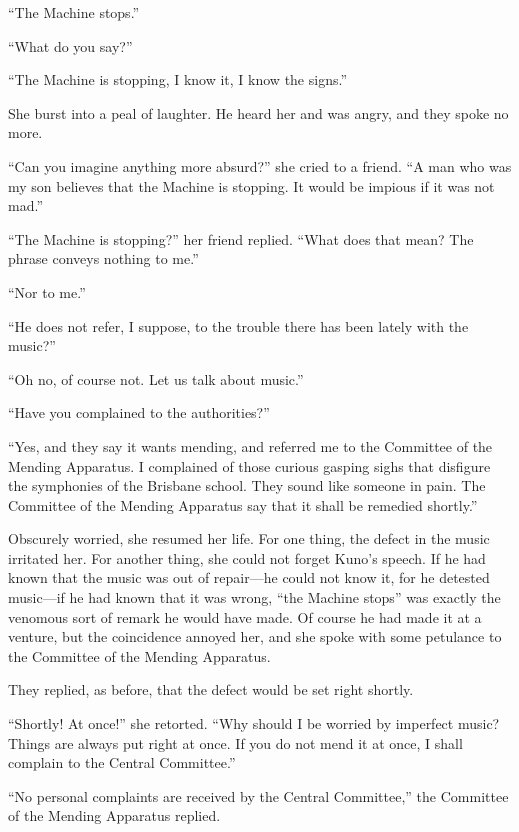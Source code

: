 ``The Machine stops.''

``What do you say?''

``The Machine is stopping, I know it, I know the signs.''

She burst into a peal of laughter. He heard her and was angry, and they spoke no more.

``Can you imagine anything more absurd?'' she cried to a friend. ``A man who was my son believes that the Machine is stopping. It would be impious if it was not mad.''

``The Machine is stopping?'' her friend replied. ``What does that mean? The phrase conveys nothing to me.''

``Nor to me.''

``He does not refer, I suppose, to the trouble there has been lately with the music?''

``Oh no, of course not. Let us talk about music.''

``Have you complained to the authorities?''

``Yes, and they say it wants mending, and referred me to the Committee of the Mending Apparatus. I complained of those curious gasping sighs that disfigure the symphonies of the Brisbane school. They sound like someone in pain. The Committee of the Mending Apparatus say that it shall be remedied shortly.'' %

Obscurely worried, she resumed her life. For one thing, the defect in the music irritated her. For another thing, she could not forget Kuno's speech. If he had known that the music was out of repair---he could not know it, for he detested music---if he had known that it was wrong, ``the Machine stops'' was exactly the venomous sort of remark he would have made. Of course he had made it at a venture, but the coincidence annoyed her, and she spoke with some petulance to the Committee of the Mending Apparatus.

They replied, as before, that the defect would be set right shortly.

``Shortly! At once!'' she retorted. ``Why should I be worried by imperfect music? Things are always put right at once. If you do not mend it at once, I shall complain to the Central Committee.''

``No personal complaints are received by the Central Committee,'' the Committee of the Mending Apparatus replied.

